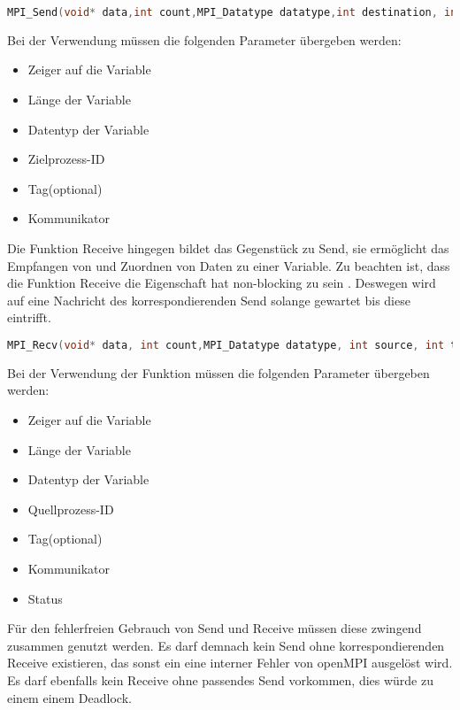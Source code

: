 \begin{lstlisting}[language=C]
MPI_Send(void* data,int count,MPI_Datatype datatype,int destination, int tag, MPI_Comm communicator)
\end{lstlisting}

Bei der Verwendung müssen die folgenden Parameter übergeben werden:

\begin{itemize}
\item Zeiger auf die Variable
\item Länge der Variable
\item Datentyp der Variable
\item Zielprozess-ID
\item Tag(optional)
\item Kommunikator
\end{itemize}

Die Funktion Receive hingegen bildet das Gegenstück zu Send, sie ermöglicht das Empfangen von  und Zuordnen von Daten zu einer Variable. Zu beachten ist, dass die Funktion Receive die Eigenschaft hat non-blocking zu sein \cite{MPI_Recv}. Deswegen wird auf eine Nachricht des korrespondierenden Send solange gewartet bis diese eintrifft. %

\begin{lstlisting}[language=C]
MPI_Recv(void* data, int count,MPI_Datatype datatype, int source, int tag, MPI_Comm communicator,MPI_Status* status)
\end{lstlisting}

Bei der Verwendung der Funktion müssen die folgenden Parameter übergeben werden:

\begin{itemize}
\item Zeiger auf die Variable
\item Länge der Variable
\item Datentyp der Variable
\item Quellprozess-ID
\item Tag(optional)
\item Kommunikator
\item Status
\end{itemize}

Für den fehlerfreien Gebrauch von Send und Receive müssen diese zwingend zusammen genutzt werden. Es darf demnach kein Send ohne korrespondierenden Receive existieren, das sonst ein eine interner Fehler von openMPI ausgelöst wird. Es darf ebenfalls kein Receive ohne passendes Send vorkommen, dies würde zu einem einem Deadlock.


